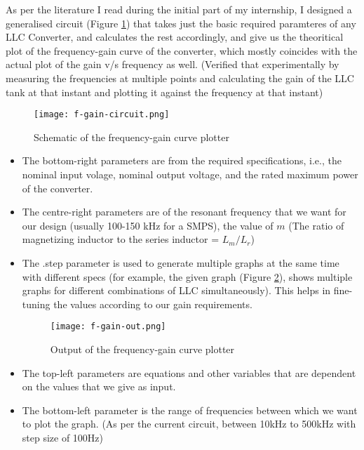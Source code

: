 As per the literature I read during the initial part of my internship, I designed a generalised circuit (Figure \ref*{fig:f-gain-circuit}) that takes just the basic required paramteres of any LLC Converter, and calculates the rest accordingly, and give us the theoritical plot of the frequency-gain curve of the converter, which mostly coincides with the actual plot of the gain v/s frequency as well. (Verified that experimentally by measuring the frequencies at multiple points and calculating the gain of the LLC tank at that instant and plotting it against the frequency at that instant)
\begin{figure}[H]
    \centering
    \texttt{[image: f-gain-circuit.png]}
    \caption{Schematic of the frequency-gain curve plotter}
    \label{fig:f-gain-circuit}
\end{figure}

\begin{itemize}
    \item The bottom-right parameters are from the required specifications, i.e., the nominal input volage, nominal output voltage, and the rated maximum power of the converter.
    \item The centre-right parameters are of the resonant frequency that we want for our design (usually 100-150 kHz for a SMPS), the value of $m$ (The ratio of magnetizing inductor to the series inductor = $L_m / L_r$)
    \item The .step parameter is used to generate multiple graphs at the same time with different specs (for example, the given graph (Figure \ref*{fig:f-gain-out}), shows multiple graphs for different combinations of LLC simultaneously). This helps in fine-tuning the values according to our gain requirements.
    \begin{figure}[H]
        \centering
        \texttt{[image: f-gain-out.png]}
        \caption{Output of the frequency-gain curve plotter}
        \label{fig:f-gain-out}
    \end{figure}
    \item The top-left parameters are equations and other variables that are dependent on the values that we give as input.
    \item The bottom-left parameter is the range of frequencies between which we want to plot the graph. (As per the current circuit, between 10kHz to 500kHz with step size of 100Hz)
\end{itemize}